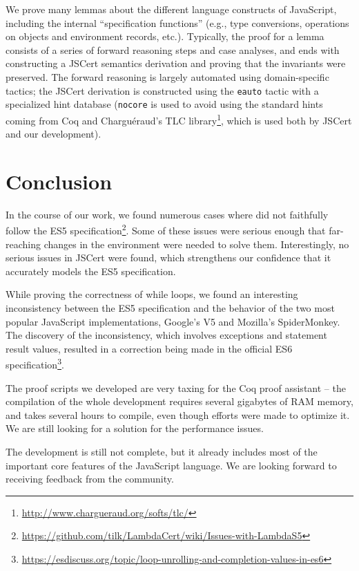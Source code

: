 \documentclass{llncs}
\begin{document}
We prove many lemmas about the different language constructs
of JavaScript, including the internal ``specification functions''
(e.g., type conversions, operations on objects and environment
records, etc.). Typically, the proof for a lemma consists of
a series of forward reasoning steps and case analyses, and ends with
constructing a JSCert semantics derivation and proving that
the invariants were preserved. The forward reasoning is largely
automated using domain-specific tactics; the JSCert derivation
is constructed using the \texttt{eauto} tactic with a specialized
hint database (\texttt{nocore} is used to avoid using the standard
hints coming from Coq and Chargu\'eraud's TLC
library\footnote{\url{http://www.chargueraud.org/softs/tlc/}}, which is
used both by JSCert and our development).

\section{Conclusion}

In the course of our work, we found numerous cases where
\lambdajs did not faithfully follow the ES5 
specification\footnote{\url{https://github.com/tilk/LambdaCert/wiki/Issues-with-LambdaS5}}.
Some of these issues were serious enough that
far-reaching changes in the \lambdajs environment were needed
to solve them. Interestingly, no serious issues in JSCert were
found, which strengthens our confidence that it accurately models
the ES5 specification.

While proving the correctness of while loops, we found an interesting
inconsistency between the ES5 specification and the behavior
of the two most popular JavaScript implementations, Google's V5 and
Mozilla's SpiderMonkey. The discovery of the inconsistency,
which involves exceptions and statement result values,
resulted in a correction being made in the official ES6
specification\footnote{\url{https://esdiscuss.org/topic/loop-unrolling-and-completion-values-in-es6}}.

The proof scripts we developed are very taxing for the Coq
proof assistant -- the compilation of the whole development
requires several gigabytes of RAM memory, and takes several
hours to compile, even though efforts were made to optimize it.
We are still looking for a solution for the performance issues.

The development is still not complete, but it already
includes most of the important core features of the
JavaScript language. We are looking forward to receiving
feedback from the community.




\end{document}
